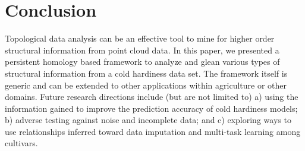 
\section{Conclusion}
\label{sec:conclusions}
Topological data analysis can be an effective tool to mine for higher order structural information from point cloud data. In this paper, we presented a persistent homology based framework to analyze and glean various types of structural information from a cold hardiness data set. The framework itself is generic and can be extended to other applications within agriculture or other domains.
Future research directions include (but are not limited to) a) using the information gained to improve the prediction accuracy of cold hardiness models; b) adverse testing against noise and incomplete data; and c) exploring ways to use relationships inferred toward data imputation and multi-task learning among cultivars. 